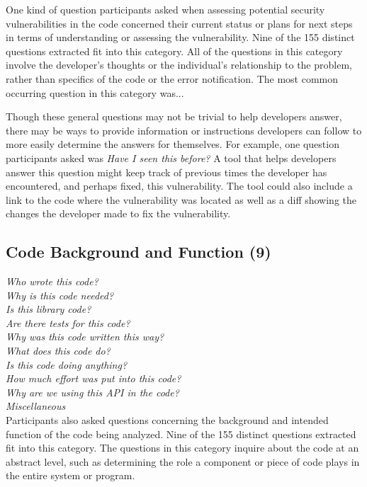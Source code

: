 \documentclass[conference]{IEEEtran}
\begin{document}
One kind of question participants asked when assessing potential security vulnerabilities in the code concerned their current status or plans for next steps in terms of understanding or assessing the vulnerability. Nine of the 155 distinct questions extracted fit into this category. All of the questions in this category involve the developer's thoughts or the individual's relationship to the problem, rather than specifics of the code or the error notification.  The most common occurring question in this category was...

Though these general questions may not be trivial to help developers answer, there may be ways to provide information or instructions developers can follow to more easily determine the answers for themselves. 
For example, one question participants asked was \textit{Have I seen this before?}
A tool that helps developers answer this question might keep track of previous times the developer has encountered, and perhaps fixed, this vulnerability. 
The tool could also include a link to the code where the vulnerability was located as well as a diff showing the changes the developer made to fix the vulnerability.


\noindent\subsection{\textbf{Code Background and Function (9)}}

\noindent\emph{Who wrote this code?} \\
\emph{Why is this code needed?} \\
\emph{Is this library code?} \\
\emph{Are there tests for this code?} \\
\emph{Why was this code written this way?} \\
\emph{What does this code do?} \\
\emph{Is this code doing anything?} \\
\emph{How much effort was put into this code?} \\
\emph{Why are we using this API in the code?} \\
\emph{Miscellaneous} \\

Participants also asked questions concerning the background and intended function of the code being analyzed. 
Nine of the 155 distinct questions extracted fit into this category. 
The questions in this category inquire about the code at an abstract level, such as determining the role a component or piece of code plays in the entire system or program.
\end{document}
